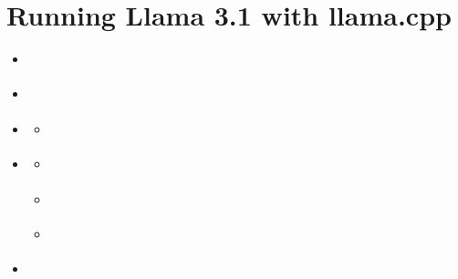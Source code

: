 \documentclass[letterpaper,10pt,english]{sphinxmanual}
\begin{document}
\chapter{Running Llama 3.1 with llama.cpp}
\label{\detokenize{llama-cpp:running-llama-3-1-with-llama-cpp}}\label{\detokenize{llama-cpp:llama-cpp-model-format-gguf}}\label{\detokenize{llama-cpp::doc}}
\begin{sphinxcontents}
\begin{itemize}
\item {} 
\sphinxAtStartPar
{}\label{\detokenize{llama-cpp:id1}}{\hyperref[\detokenize{llama-cpp:model-format-gguf}]{}}

\item {} 
\sphinxAtStartPar
{}\label{\detokenize{llama-cpp:id2}}{\hyperref[\detokenize{llama-cpp:compile-llama-cpp-for-intel-i7-cpu-only}]{}}

\item {} 
\sphinxAtStartPar
{}\label{\detokenize{llama-cpp:id3}}{\hyperref[\detokenize{llama-cpp:run-the-model-with-web-interface}]{}}
\begin{itemize}
\item {} 
\sphinxAtStartPar
{}\label{\detokenize{llama-cpp:id4}}{\hyperref[\detokenize{llama-cpp:features}]{}}

\end{itemize}

\item {} 
\sphinxAtStartPar
{}\label{\detokenize{llama-cpp:id5}}{\hyperref[\detokenize{llama-cpp:compile-llama-cpp-with-nvidia-gpu-support-cuda}]{}}
\begin{itemize}
\item {} 
\sphinxAtStartPar
{}\label{\detokenize{llama-cpp:id6}}{\hyperref[\detokenize{llama-cpp:prerequisites}]{}}

\item {} 
\sphinxAtStartPar
{}\label{\detokenize{llama-cpp:id7}}{\hyperref[\detokenize{llama-cpp:build-with-cuda}]{}}

\item {} 
\sphinxAtStartPar
{}\label{\detokenize{llama-cpp:id8}}{\hyperref[\detokenize{llama-cpp:run-with-gpu-offloading}]{}}

\end{itemize}

\item {} 
\sphinxAtStartPar
{}\label{\detokenize{llama-cpp:id9}}{\hyperref[\detokenize{llama-cpp:summary}]{}}

\end{itemize}
\end{sphinxcontents}
\end{document}

